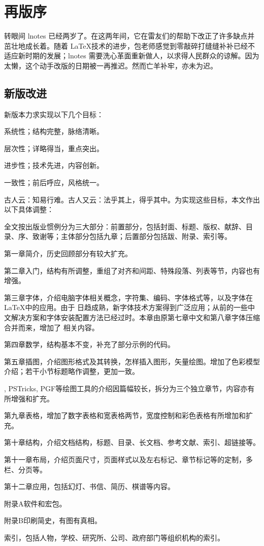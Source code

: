 \chapter{再版序}

转眼间 lnotes 已经两岁了。在这两年间，它在雷友们的帮助下改正了许多缺点并茁壮地成长着。随着 \LaTeX 技术的进步，包老师感觉到零敲碎打缝缝补补已经不适应新时期的发展；lnotes 需要洗心革面重新做人，以求得人民群众的谅解。因为太懒，这个动手改版的日期被一再推迟。然而亡羊补牢，亦未为迟。

\section*{新版改进}
新版本力求实现以下几个目标：

\begin{compactenum}
    \item 系统性；结构完整，脉络清晰。
    \item 层次性；详略得当，重点突出。
    \item 进步性；技术先进，内容创新。
    \item 一致性；前后呼应，风格统一。
\end{compactenum}

古人云：知易行难。古人又云：法乎其上，得乎其中。为实现这些目标，本文作出以下具体调整：

\begin{compactenum}
    \item 全文按出版业惯例分为三大部分：前置部分，包括封面、标题、版权、献辞、目录、序、致谢等；主体部分包括九章；后置部分包括跋、附录、索引等。
    \item 第一章简介，历史回顾部分有较大扩充。
    \item 第二章入门，结构有所调整，重组了对齐和间距、特殊段落、列表等节，内容也有增强。
    \item 第三章字体，介绍电脑字体相关概念，字符集、编码、字体格式等，以及字体在 \LaTeX 中的应用。由于 \XeTeX 日趋成熟，新字体技术方案得到广泛应用；从前的一些中文解决方案和字体安装配置方法已经过时。本章由原第七章中文和第八章字体压缩合并而来，增加了 \XeTeX 相关内容。
    \item 第四章数学，结构基本不变，补充了部分示例的代码。
    \item 第五章插图，介绍图形格式及其转换，怎样插入图形，矢量绘图。增加了色彩模型介绍；若干小节标题略作调整，更加一致。
    \item \MP, PSTricks, PGF等绘图工具的介绍因篇幅较长，拆分为三个独立章节，内容亦有所增强和扩充。
    \item 第九章表格，增加了数字表格和宽表格两节，宽度控制和彩色表格有所增加和扩充。
    \item 第十章结构，介绍文档结构，标题、目录、长文档、参考文献、索引、超链接等。
    \item 第十一章布局，介绍页面尺寸，页面样式以及左右标记、章节标记等的定制，多栏、分页等。
    \item 第十二章应用，包括幻灯、书信、简历、棋谱等内容。
    \item 附录A软件和宏包。
    \item 附录B印刷简史，有图有真相。
    \item 索引，包括人物，学校、研究所、公司、政府部门等组织机构的索引。
\end{compactenum}

